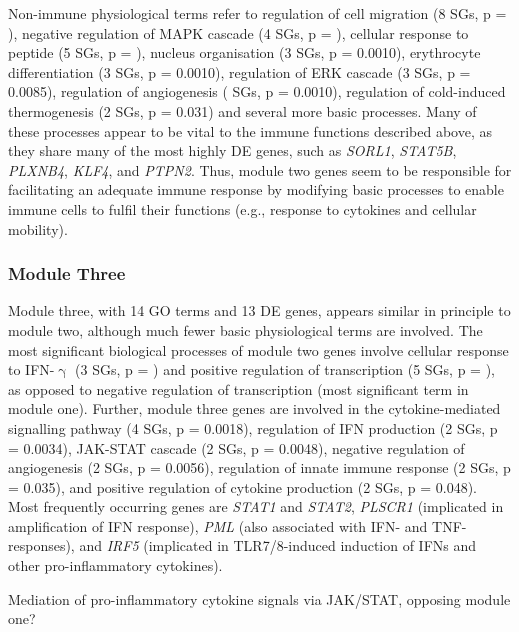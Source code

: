 Non-immune physiological terms refer to regulation of cell migration (8 SGs, p = ), negative regulation of MAPK cascade (4 SGs, p = ), cellular response to peptide (5 SGs, p = ), nucleus organisation (3 SGs, p = 0.0010), erythrocyte differentiation (3 SGs, p = 0.0010), regulation of ERK cascade (3 SGs, p = 0.0085), regulation of angiogenesis ( SGs, p = 0.0010), regulation of cold-induced thermogenesis (2 SGs, p = 0.031) and several more basic processes. Many of these processes appear to be vital to the immune functions described above, as they share many of the most highly DE genes, such as \emph{SORL1}, \emph{STAT5B}, \emph{PLXNB4}, \emph{KLF4}, and \emph{PTPN2}. Thus, module two genes seem to be responsible for facilitating an adequate immune response by modifying basic processes to enable immune cells to fulfil their functions (e.g., response to cytokines and cellular mobility). 
 
\subsubsection{Module Three}
Module three, with 14 GO terms and 13 DE genes, appears similar in principle to module two, although much fewer basic physiological terms are involved. The most significant biological processes of module two genes involve cellular response to IFN-$\upgamma$ (3 SGs, p = ) and positive regulation of transcription (5 SGs, p = ), as opposed to negative regulation of transcription (most significant term in module one). Further, module three genes are involved in the cytokine-mediated signalling pathway (4 SGs, p = 0.0018), regulation of IFN production (2 SGs, p = 0.0034), JAK-STAT cascade (2 SGs, p = 0.0048), negative regulation of angiogenesis (2 SGs, p = 0.0056), regulation of innate immune response (2 SGs, p = 0.035), and positive regulation of cytokine production (2 SGs, p = 0.048). Most frequently occurring genes are \emph{STAT1} and \emph{STAT2}, \emph{PLSCR1} (implicated in amplification of IFN response), \emph{PML} (also associated with IFN- and TNF-responses), and \emph{IRF5} (implicated in TLR7/8-induced induction of IFNs and other pro-inflammatory cytokines).

Mediation of pro-inflammatory cytokine signals via JAK/STAT, opposing module one?


